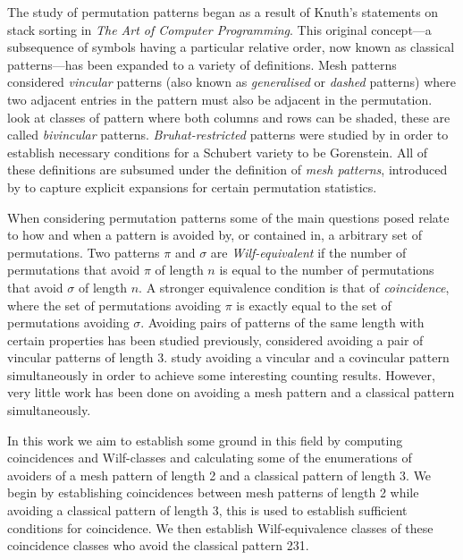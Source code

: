 The study of permutation patterns began as a result of Knuth's statements on stack sorting in
\emph{The Art of Computer Programming}\cite[p.~243, Ex.~5,6]{Knuth:1997:ACP:260999}. This original
concept---a subsequence of symbols having a particular relative order, now known as classical
patterns---has been expanded to a variety of definitions. Mesh patterns \textcite{babstein2000} 
considered \emph{vincular} patterns (also known as \emph{generalised} or \emph{dashed} 
patterns) where two adjacent entries in the pattern must also be adjacent in the permutation. 
\textcite{MR2652101} look at classes of pattern where both columns and rows can be shaded, these are
called \emph{bivincular} patterns. \emph{Bruhat-restricted} patterns were studied by 
\textcite{MR2264071} in order to establish necessary conditions for a Schubert variety to be
Gorenstein. All of these definitions are subsumed under the definition of \emph{mesh patterns},
introduced by \textcite{journals/combinatorics/BrandenC11} to capture explicit expansions for 
certain permutation statistics.

When considering permutation patterns some of the main questions posed relate to how and when a
pattern is avoided by, or contained in, a arbitrary set of permutations. Two patterns \(\pi\) and
\(\sigma\) are \emph{Wilf-equivalent} if the number of permutations that avoid \(\pi\) of length 
\(n\) is equal to the number of permutations that avoid \(\sigma\) of length \(n\). A stronger 
equivalence condition is that of \emph{coincidence}, where the set of permutations avoiding \(\pi\)
is exactly equal to the set of permutations avoiding \(\sigma\). Avoiding pairs of patterns of the
same length with certain properties has been studied previously, \textcite{MR2178749} considered 
avoiding a pair of vincular patterns of length 3. \textcite{2015arXiv151203226B} study avoiding a 
vincular and a covincular pattern simultaneously in order to achieve some interesting counting 
results. However, very little work has been done on avoiding a mesh pattern and a classical pattern 
simultaneously. 

In this work we aim to establish some ground in this field by computing coincidences
and Wilf-classes and calculating some of the enumerations of avoiders of a mesh pattern of length
2 and a classical pattern of length 3. We begin by establishing coincidences between mesh patterns
of length 2 while avoiding a classical pattern of length 3, this is used to establish sufficient
conditions for coincidence. We then establish Wilf-equivalence classes of these coincidence classes
who avoid the classical pattern 231.